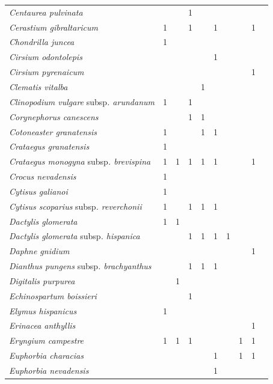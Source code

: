 {\begin{longtable}{llllllllll}
\textit{Centaurea pulvinata}  &  &  & 1 &  &  &  &  &  \\
\textit{Cerastium gibraltaricum}  & 1 &  & 1 &  & 1 &  &  & 1 \\
\textit{Chondrilla juncea}  & 1 &  &  &  &  &  &  &  \\
\textit{Cirsium odontolepis}  &  &  &  &  & 1 &  &  &  \\
\textit{Cirsium pyrenaicum}  &  &  &  &  &  &  &  & 1 \\
\textit{Clematis vitalba}  &  &  &  & 1 &  &  &  &  \\
\textit{Clinopodium vulgare }subsp\textit{. arundanum}  & 1 &  & 1 &  &  &  &  &  \\
\textit{Corynephorus canescens}  &  &  & 1 & 1 &  &  &  &  \\
\textit{Cotoneaster granatensis}  & 1 &  &  & 1 & 1 &  &  &  \\
\textit{Crataegus granatensis}  & 1 &  &  &  &  &  &  &  \\
\textit{Crataegus monogyna }subsp\textit{. brevispina}  & 1 & 1 & 1 & 1 & 1 &  &  & 1 \\
\textit{Crocus nevadensis}  & 1 &  &  &  &  &  &  &  \\
\textit{Cytisus galianoi}  & 1 &  &  &  &  &  &  &  \\
\textit{Cytisus scoparius }subsp\textit{. reverchonii}  & 1 &  & 1 & 1 & 1 &  &  &  \\
\textit{Dactylis glomerata}  & 1 & 1 &  &  &  &  &  &  \\
\textit{Dactylis glomerata }subsp\textit{. hispanica}  &  &  & 1 & 1 & 1 & 1 &  &  \\
\textit{Daphne gnidium}  &  &  &  &  &  &  &  & 1 \\
\textit{Dianthus pungens }subsp\textit{. brachyanthus}  &  &  & 1 & 1 & 1 &  &  &  \\
\textit{Digitalis purpurea}  &  & 1 &  &  &  &  &  &  \\
\textit{Echinospartum boissieri}  &  &  & 1 &  &  &  &  &  \\
\textit{Elymus hispanicus}  & 1 &  &  &  &  &  &  &  \\
\textit{Erinacea anthyllis}  &  &  &  &  &  &  &  & 1 \\
\textit{Eryngium campestre}  & 1 & 1 & 1 &  &  &  & 1 & 1 \\
\textit{Euphorbia characias}  &  &  &  &  & 1 &  & 1 & 1 \\
\textit{Euphorbia nevadensis}  &  &  &  &  & 1 &  &  &  \\

\end{longtable}}
